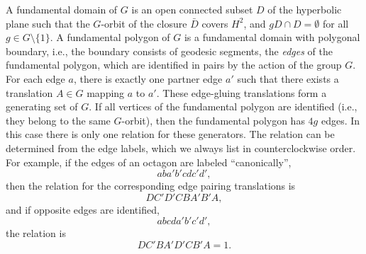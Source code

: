 \documentclass[Thesis]{subfiles}
\begin{document}
A fundamental domain of $G$ is an open connected subset $D$ of the
hyperbolic plane such that the $G$-orbit of the closure $\bar D$
covers $H^{2}$, and $gD\cap D=\emptyset$ for all $g\in
G\setminus\{1\}$.  A fundamental polygon of $G$ is a fundamental
domain with polygonal boundary, i.e., the boundary consists of
geodesic segments, the \emph{edges} of the fundamental polygon, which
are identified in pairs by the action of the group $G$. For each edge
$a$, there is exactly one partner edge $a'$ such that there exists a
translation $A\in G$ mapping $a$ to $a'$. These edge-gluing
translations form a generating set of $G$. If all vertices of the
fundamental polygon are identified (i.e., they belong to the same
$G$-orbit), then the fundamental polygon has $4g$ edges. In this case
there is only one relation for these generators. The relation can be
determined from the edge labels, which we always list in
counterclockwise order. For example, if the edges of an octagon are
labeled ``canonically'',
\begin{equation}
\label{eq:canonical_polygon}
aba'b'cdc'd',
\end{equation}
then the relation for the corresponding edge pairing
translations is 
\begin{equation}
  \label{eq:canonical_relation_g2}
  DC'D'CBA'B'A, 
\end{equation}
and if opposite edges are identified,
\begin{equation}
  \label{eq:opposite_polygon_g2}
  abcda'b'c'd', 
\end{equation}
the relation is 
\begin{equation}
\label{eq:opposite_relation_g2}
DC'BA'D'CB'A=1.
\end{equation}

\end{document}

